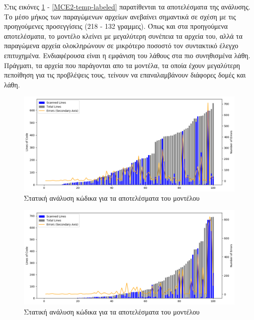 Στις εικόνες \ref{static-temp-char} - \ref{MCE2-temp-labeled} παρατίθενται τα αποτελέσματα της ανάλυσης.
Το μέσο μήκος των παραγώμενων αρχείων ανεβαίνει σημαντικά σε σχέση με τις προηγούμενες προσεγγίσεις (218 - 132 γραμμες).
Όπως και στα προηγούμενα αποτελέσματα, το μοντέλο  κλείνει με μεγαλύτερη συνέπεια τα αρχεία του, αλλά τα παραγώμενα αρχεία ολοκληρώνουν σε μικρότερο ποσοστό τον συντακτικό έλεγχο επιτυχημένα.
Ενδιαφέρουσα είναι η εμφάνιση του λάθους  στα πιο συνηθισμένα λάθη.
Πράγματι, τα αρχεία που παράγονται απο τα μοντέλα, τα οποία έχουν μεγαλύτερη πεποίθηση για τις προβλέψεις τους, τείνουν να επαναλαμβάνουν διάφορες δομές και λάθη.

\begin{figure}
	\caption{Στατική ανάλυση κώδικα για τα αποτελέσματα του  μοντέλου}
	\label{static-temp-char}
	\includegraphics[width=\textwidth, keepaspectratio]{images/temp-char.png}
\end{figure}

\begin{figure}
	\caption{Στατική ανάλυση κώδικα για τα αποτελέσματα του  μοντέλου}
	\label{static-temp-labeled}
	\includegraphics[width=\textwidth, keepaspectratio]{images/temp-labeled.png}
\end{figure}

